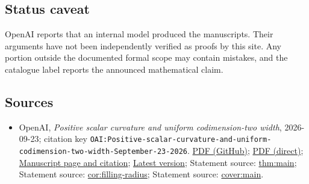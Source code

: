 \documentclass[11pt]{article}
\begin{document}
\subsection{Status caveat}
OpenAI reports that an internal model produced the manuscripts. Their arguments have not been independently verified as proofs by this site. Any portion outside the documented formal scope may contain mistakes, and the catalogue label reports the announced mathematical claim.

\subsection{Sources}
\begin{itemize}
\item OpenAI, \emph{Positive scalar curvature and uniform codimension-two width}, 2026-09-23; citation key \texttt{OAI:Positive-scalar-curvature-and-uniform-codimension-two-width-September-23-2026}. \href{https://github.com/openai/math/blob/adc7f1241b42e322a6451854ab7e4b4c146bf78a/preprints/Positive-scalar-curvature-and-uniform-codimension-two-width-September-23-2026/paper.pdf}{PDF (GitHub)}; \href{https://github.com/openai/math/raw/adc7f1241b42e322a6451854ab7e4b4c146bf78a/preprints/Positive-scalar-curvature-and-uniform-codimension-two-width-September-23-2026/paper.pdf}{PDF (direct)}; \href{https://github.com/openai/math/blob/adc7f1241b42e322a6451854ab7e4b4c146bf78a/preprints/Positive-scalar-curvature-and-uniform-codimension-two-width-September-23-2026/README.md}{Manuscript page and citation}; \href{https://github.com/openai/math/blob/main/preprints/Positive-scalar-curvature-and-uniform-codimension-two-width-September-23-2026/paper.pdf}{Latest version}; Statement source: \href{https://github.com/openai/math/blob/adc7f1241b42e322a6451854ab7e4b4c146bf78a/preprints/Positive-scalar-curvature-and-uniform-codimension-two-width-September-23-2026/build/sections/introduction.tex\#L24}{thm:main}; Statement source: \href{https://github.com/openai/math/blob/adc7f1241b42e322a6451854ab7e4b4c146bf78a/preprints/Positive-scalar-curvature-and-uniform-codimension-two-width-September-23-2026/build/sections/introduction.tex\#L52}{cor:filling-radius}; Statement source: \href{https://github.com/openai/math/blob/adc7f1241b42e322a6451854ab7e4b4c146bf78a/preprints/Positive-scalar-curvature-and-uniform-codimension-two-width-September-23-2026/build/sections/introduction.tex\#L83}{cover:main}.

\end{itemize}
\end{document}
